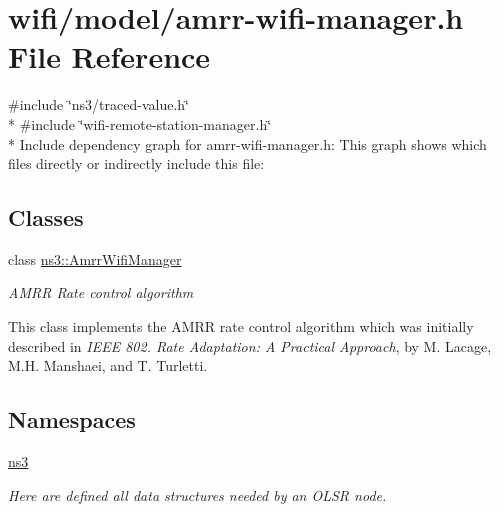 \hypertarget{amrr-wifi-manager_8h}{}\section{wifi/model/amrr-\/wifi-\/manager.h File Reference}
\label{amrr-wifi-manager_8h}
{\ttfamily \#include \char`\"{}ns3/traced-\/value.\+h\char`\"{}}\\*
{\ttfamily \#include \char`\"{}wifi-\/remote-\/station-\/manager.\+h\char`\"{}}\\*
Include dependency graph for amrr-\/wifi-\/manager.h\+:
This graph shows which files directly or indirectly include this file\+:
\subsection*{Classes}
\begin{DoxyCompactItemize}
\item 
class \hyperlink{classns3_1_1AmrrWifiManager}{ns3\+::\+Amrr\+Wifi\+Manager}
\begin{DoxyCompactList}\small\item\em A\+M\+RR Rate control algorithm

This class implements the A\+M\+RR rate control algorithm which was initially described in {\itshape I\+E\+EE 802. Rate Adaptation\+: A Practical Approach}, by M. Lacage, M.\+H. Manshaei, and T. Turletti. \end{DoxyCompactList}\end{DoxyCompactItemize}
\subsection*{Namespaces}
\begin{DoxyCompactItemize}
\item 
 \hyperlink{namespacens3}{ns3}
\begin{DoxyCompactList}\small\item\em Here are defined all data structures needed by an O\+L\+SR node. \end{DoxyCompactList}\end{DoxyCompactItemize}
